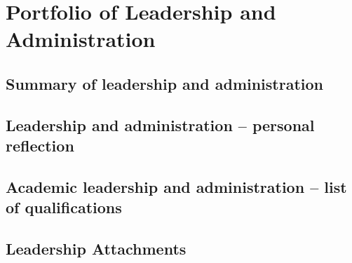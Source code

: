 \chapter{Portfolio of Leadership and Administration}

\section{Summary of leadership and administration} \label{sec:summary-of-leadership-and-administration}

\section{Leadership and administration -- personal reflection} \label{sec:leadership-and-administration-personal-reflection}

\section{Academic leadership and administration -- list of qualifications} \label{sec:academic-leadership-and-administration-list-of-qualifications}

\section{Leadership Attachments} \label{sec:leadership-attachments}
